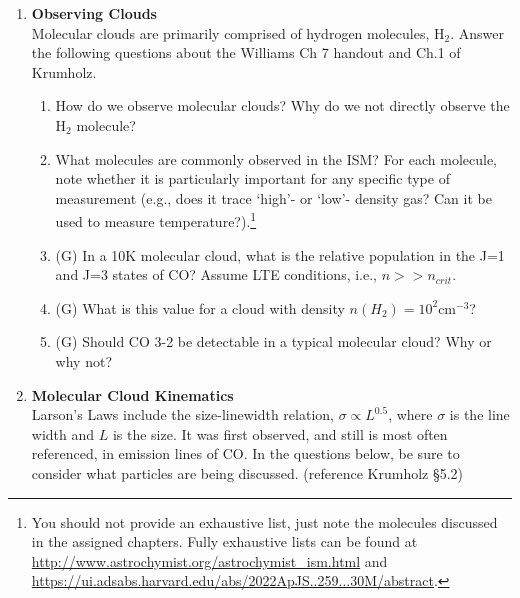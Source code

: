 \documentclass{article}
\begin{document}
\begin{enumerate}
\item  \textbf{Observing Clouds} \\
    Molecular clouds are primarily comprised of hydrogen molecules, H$_2$.
    Answer the following questions about the Williams Ch 7 handout
    and Ch.1 of Krumholz.

    \begin{enumerate}
        \item How do we observe molecular clouds?
            Why do we not directly observe the H$_2$ molecule?
        \item What molecules are commonly observed in the ISM?
            For each molecule, note whether it is particularly important for any specific type
            of measurement (e.g., does it trace `high'- or `low'- density gas?  Can it be
            used to measure temperature?).\footnote{
            You should not provide an exhaustive list, just note the molecules discussed in the
            assigned chapters.  Fully exhaustive lists can be found at
            \url{http://www.astrochymist.org/astrochymist_ism.html} and
            \url{https://ui.adsabs.harvard.edu/abs/2022ApJS..259...30M/abstract}.}
        \item (G) In a 10K molecular cloud, what is the relative population in the J=1 and J=3 states of CO?
            Assume LTE conditions, i.e., $n>>n_{crit}$.
        \item (G) What is this value for a cloud with density $n(H_2)=10^2 \mathrm{cm}^{-3}$?
        \item (G) Should CO 3-2 be detectable in a typical molecular cloud?  Why or why not?
    \end{enumerate}

\item \textbf{Molecular Cloud Kinematics} \\

    Larson's Laws include the size-linewidth relation, $\sigma \propto L^{0.5}$, where $\sigma$ is the line width and $L$ is the size.
    It was first observed, and still is most often referenced, in emission lines of CO.
    In the questions below, be sure to consider what particles are being discussed.
    (reference Krumholz \S 5.2)


\end{enumerate}
\end{document}
